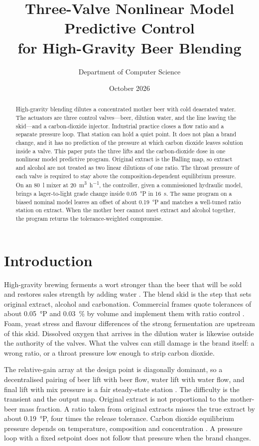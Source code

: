 \documentclass[11pt,a4paper]{article}
\title{Three-Valve Nonlinear Model Predictive Control\\ for High-Gravity Beer Blending}
\author{Department of Computer Science}
\date{October 2026}
\begin{document}
\maketitle
\begin{abstract}
\noindent
High-gravity blending dilutes a concentrated mother beer with cold deaerated water. The actuators are three control valves---beer, dilution water, and the line leaving the skid---and a carbon-dioxide injector. Industrial practice closes a flow ratio and a separate pressure loop. That station can hold a quiet point. It does not plan a brand change, and it has no prediction of the pressure at which carbon dioxide leaves solution inside a valve. This paper puts the three lifts and the carbon-dioxide dose in one nonlinear model predictive program. Original extract is the Balling map, so extract and alcohol are not treated as two linear dilutions of one ratio. The throat pressure of each valve is required to stay above the composition-dependent equilibrium pressure. On an \SI{80}{\litre} mixer at \SI{20}{\cubic\metre\per\hour}, the controller, given a commissioned hydraulic model, brings a lager-to-light grade change inside \SI{0.05}{\degree}P in \SI{16}{\second}. The same program on a biased nominal model leaves an offset of about \SI{0.19}{\degree}P and matches a well-tuned ratio station on extract. When the mother beer cannot meet extract and alcohol together, the program returns the tolerance-weighted compromise.
\end{abstract}

\section{Introduction}
High-gravity brewing ferments a wort stronger than the beer that will be sold and restores sales strength by adding water \citep{stewart2010,kunze2019}. The blend skid is the step that sets original extract, alcohol and carbonation. Commercial frames quote tolerances of about \SI{0.05}{\degree}P and \SI{0.03}{\percent} by volume and implement them with ratio control \citep{centec2024,corosysweb}. Foam, yeast stress and flavour differences of the strong fermentation are upstream of this skid. Dissolved oxygen that arrives in the dilution water is likewise outside the authority of the valves. What the valves can still damage is the brand itself: a wrong ratio, or a throat pressure low enough to strip carbon dioxide.

The relative-gain array at the design point is diagonally dominant, so a decentralised pairing of beer lift with beer flow, water lift with water flow, and final lift with mix pressure is a fair steady-state station \citep{bristol1966,shinskey1996}. The difficulty is the transient and the output map. Original extract is not proportional to the mother-beer mass fraction. A ratio taken from original extracts misses the true extract by about \SI{0.19}{\degree}P, four times the release tolerance. Carbon dioxide equilibrium pressure depends on temperature, composition and concentration \citep{speers2013,rammert1991}. A pressure loop with a fixed setpoint does not follow that pressure when the brand changes.
\end{document}
